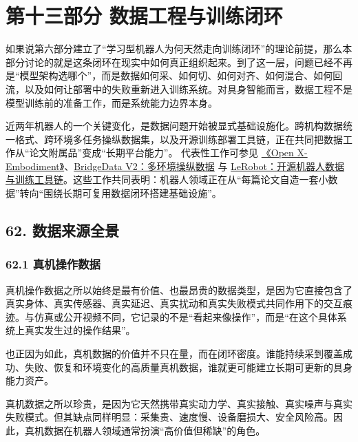 
\part*{第十三部分 数据工程与训练闭环}

如果说第六部分建立了“学习型机器人为何天然走向训练闭环”的理论前提，那么本部分讨论的就是这条闭环在现实中如何真正组织起来。到了这一层，问题已经不再是“模型架构选哪个”，而是数据如何采、如何切、如何对齐、如何混合、如何回流，以及如何让部署中的失败重新进入训练系统。对具身智能而言，数据工程不是模型训练前的准备工作，而是系统能力边界本身。

近两年机器人的一个关键变化，是数据问题开始被显式基础设施化。跨机构数据统一格式、跨环境多任务操纵数据集，以及开源训练部署工具链，正在共同把数据工作从“论文附属品”变成“长期平台能力”。 代表性工作可参见 \href{https://arxiv.org/abs/2310.08864}{《Open X-Embodiment》}、\href{https://arxiv.org/abs/2308.12952}{BridgeData V2：多环境操纵数据} 与 \href{https://arxiv.org/abs/2602.22818}{LeRobot：开源机器人数据与训练工具链}。这些工作共同表明：机器人领域正在从“每篇论文自造一套小数据”转向“围绕长期可复用数据闭环搭建基础设施”。

\chapter*{62. 数据来源全景}

\section*{62.1 真机操作数据}


真机操作数据之所以始终是最有价值、也最昂贵的数据类型，是因为它直接包含了真实身体、真实传感器、真实延迟、真实扰动和真实失败模式共同作用下的交互痕迹。与仿真或公开视频不同，它记录的不是“看起来像操作”，而是“在这个具体系统上真实发生过的操作结果”。

也正因为如此，真机数据的价值并不只在量，而在闭环密度。谁能持续采到覆盖成功、失败、恢复和环境变化的高质量真机数据，谁就更可能建立长期可更新的具身能力资产。

真机数据之所以珍贵，是因为它天然携带真实动力学、真实接触、真实噪声与真实失败模式。但其缺点同样明显：采集贵、速度慢、设备磨损大、安全风险高。因此，真机数据在机器人领域通常扮演“高价值但稀缺”的角色。

